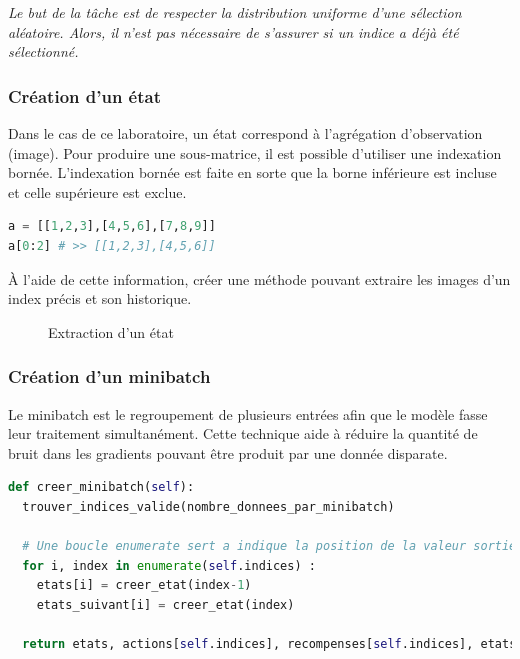 \documentclass{article}
\begin{document}
\bigbreak
\textit{Le but de la tâche est de respecter la distribution uniforme d'une sélection aléatoire. Alors, il n'est pas nécessaire de s'assurer si un indice a déjà été sélectionné.}

\subsubsection{Création d'un état}
Dans le cas de ce laboratoire, un état correspond à l'agrégation d'observation (image). Pour produire une sous-matrice, il est possible d'utiliser une indexation bornée. L'indexation bornée est faite en sorte que la borne inférieure est incluse et celle supérieure est exclue.

\bigbreak
\begin{lstlisting}[language=Python, caption={Indexation bornée}, label={code:index}]
a = [[1,2,3],[4,5,6],[7,8,9]]
a[0:2] # >> [[1,2,3],[4,5,6]]
\end{lstlisting}
\bigbreak

À l'aide de cette information, créer une méthode pouvant extraire les images d'un index précis et son historique.
\bigbreak

\begin{figure}[H]
  \centering
  \caption{Extraction d'un état}
  \label{fig:index}
\end{figure}

\subsubsection{Création d'un minibatch}
Le minibatch est le regroupement de plusieurs entrées afin que le modèle fasse leur traitement simultanément. Cette technique aide à réduire la quantité de bruit dans les gradients pouvant être produit par une donnée disparate.

\bigbreak
\begin{lstlisting}[language=Python, caption={Création d'un minibatch}, label={code:minibatch}]
def creer_minibatch(self):
  trouver_indices_valide(nombre_donnees_par_minibatch)

  # Une boucle enumerate sert a indique la position de la valeur sortie simultanement
  for i, index in enumerate(self.indices) :
    etats[i] = creer_etat(index-1)
    etats_suivant[i] = creer_etat(index)

  return etats, actions[self.indices], recompenses[self.indices], etats_suivant, drapeaux[self.indices]
\end{lstlisting}
\end{document}
